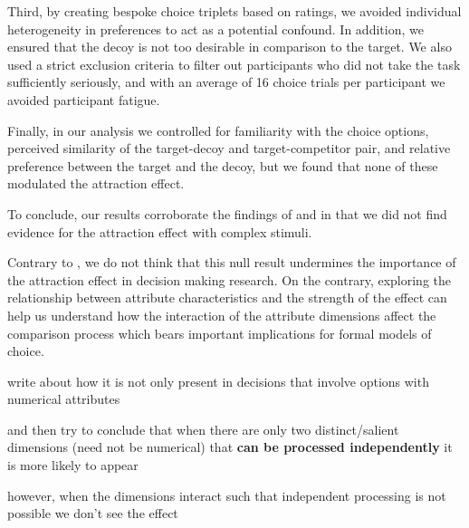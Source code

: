 \documentclass[12pt, a4paper]{article}
\begin{document}
Third, by creating bespoke choice triplets based on ratings, we avoided individual heterogeneity in preferences to act as a potential confound. In addition, we ensured that the decoy is not too desirable in comparison to the target. We also used a strict exclusion criteria to filter out participants who did not take the task sufficiently seriously, and with an average of 16 choice trials per participant we avoided participant fatigue.


Finally, in our analysis we controlled for familiarity with the choice options, perceived similarity of the target-decoy and target-competitor pair, and relative preference between the target and the decoy, but we found that none of these modulated the attraction effect.


To conclude, our results corroborate the findings of \citeauthor{Frederick2014} and \citeauthor{Yang2014} in that we did not find evidence for the attraction effect with complex stimuli. 


Contrary to \citeauthor{Frederick2014}, we do not think that this null result undermines the importance of the attraction effect in decision making research. On the contrary, exploring the relationship between attribute characteristics and the strength of the effect can help us understand how the interaction of the attribute dimensions affect the comparison process which bears important implications for formal models of choice.

write about how it is not only present in decisions that involve options with numerical attributes

and then try to conclude that when there are only two distinct/salient dimensions (need not be numerical) that \textbf{can be processed independently} it is more likely to appear

however, when the dimensions interact such that independent processing is not possible we don't see the effect

  




\newpage







 
\end{document}
